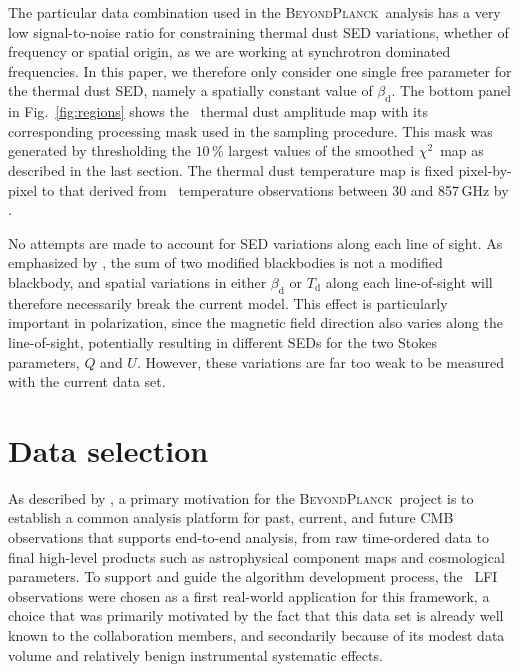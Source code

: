 \documentclass[twocolumn]{aa}
\def\chisq{$\chi^2$}
\newcommand{\BP}{\textsc{BeyondPlanck}}
\newcommand{\?}[1]{\textcolor{red}{{\bf [#1]}}}
\begin{document}
The particular data combination used in the \BP\ analysis has a very low
signal-to-noise ratio for constraining thermal dust SED variations, whether of
frequency or spatial origin, as we are working at synchrotron dominated frequencies.
In this paper, we therefore only consider one single free parameter for the thermal
dust SED, namely a spatially constant value of $\beta_{\mathrm{d}}$. The bottom
panel in Fig.~\ref{fig:regions} shows the \Planck\ thermal dust amplitude map
\citep{planck2016-l04} with its corresponding processing mask used in the
sampling procedure. This mask was generated by thresholding the $10\,\%$ largest
values of the smoothed \chisq\ map as described in the last section.  The thermal
dust temperature map is fixed pixel-by-pixel to that derived from \Planck\
temperature observations between 30 and 857\,GHz by \citet{planck2020-LVII}.

No attempts are made to account for SED variations along each line of
sight. As emphasized by \citet{Tassis2015}, the sum of two modified
blackbodies is not a modified blackbody, and spatial variations in
either $\beta_{\mathrm{d}}$ or $T_{\mathrm{d}}$ along each
line-of-sight will therefore necessarily break the current model. This
effect is particularly important in polarization, since the magnetic
field direction also varies along the line-of-sight, potentially
resulting in different SEDs for the two Stokes parameters, $Q$ and
$U$. However, these variations are far too weak to be measured with
the current data set.

\section{Data selection}
\label{sec:data}

As described by \citet{bp01}, a primary motivation for the \BP\ project is to
establish a common analysis platform for past, current, and future CMB
observations that supports end-to-end analysis, from raw time-ordered data to
final high-level products such as astrophysical component maps and cosmological
parameters. To support and guide the algorithm development process, the \Planck\
LFI observations were chosen as a first real-world application for this
framework, a choice that was primarily motivated by the fact that this data set
is already well known to the collaboration members, and secondarily because of its modest
data volume and relatively benign instrumental systematic effects.
\end{document}
